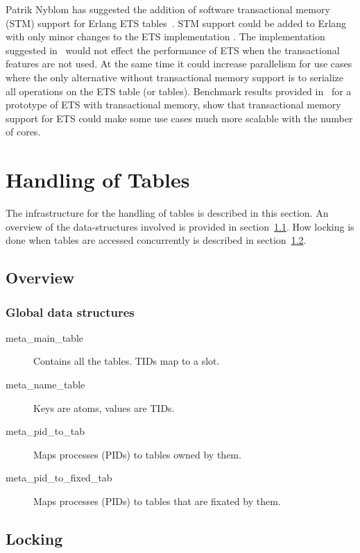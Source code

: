 \documentclass[aps,pre,preprint,nofootinbib]{revtex4}
\begin{document}
  Patrik Nyblom has suggested the addition of software transactional memory (STM) support for Erlang ETS tables~\cite{PatrikErlangTrans}.
  STM support could be added to Erlang with only minor changes to the ETS implementation \cite{PatrikErlangTrans}.
  The implementation suggested in~\cite{PatrikErlangTrans} would not effect the performance of ETS when the transactional features are not used.
  At the same time it could increase parallelism for use cases where the only alternative without transactional memory support is to serialize all operations on the ETS table (or tables).
  Benchmark results provided in~\cite{PatrikErlangTrans} for a prototype of ETS with transactional memory, show that transactional memory support for ETS could make some use cases much more scalable with the number of cores.
  

\section{Handling of Tables}

The infrastructure for the handling of tables is described in this section. 
An overview of the data-structures involved is provided in section~\ref{sec:tables_overview}.
How locking is done when tables are accessed concurrently is described in section~\ref{sec:tables_locking}.

\subsection{Overview} \label{sec:tables_overview}

\subsubsection{Global data structures}

\begin{description}
  \item[meta\_main\_table] Contains all the tables. TIDs map to a slot.
  \item[meta\_name\_table] Keys are atoms, values are TIDs.
  \item[meta\_pid\_to\_tab] Maps processes (PIDs) to tables owned by them.
  \item[meta\_pid\_to\_fixed\_tab] Maps processes (PIDs) to tables that are
    fixated by them.
\end{description}

\subsection{Locking} \label{sec:tables_locking}
\end{document}
